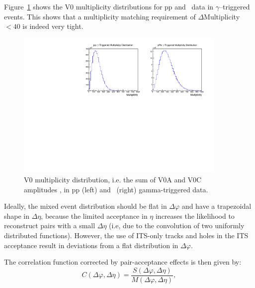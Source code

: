  Figure~\ref{fig:Multiplicitydistributions} shows the V0 multiplicity distributions for pp and \pPb~data in $\gamma$--triggered events. This shows that a multiplicity matching requirement of \(\Delta\)Multiplicity \(< 40\) is indeed very tight.

\begin{figure}[h]
\center
\includegraphics[width=0.9\textwidth]{Data_Analysis/EventMixing/Abs_Multplicity_Dist.pdf}
\caption{V0 multiplicity distribution, i.e. the sum of V0A and V0C amplitudes , in pp (left) and \pPb~(right) gamma-triggered data.}
\label{fig:Multiplicitydistributions}
\end{figure}

Ideally, the mixed event distribution should be flat in \(\Delta\varphi\) and have a trapezoidal shape in \(\Delta\eta\), because the limited acceptance in \(\eta\) increases the likelihood to reconstruct pairs with a small \(\Delta\eta\) (i.e, due to the convolution of two uniformly distributed functions). However, the use of ITS-only tracks and holes in the ITS acceptance result in deviations from a flat distribution in \(\Delta\varphi\). %

The correlation function corrected by pair-acceptance effects is then given by:
\begin{equation}
\label{eq:Y}
C(\Delta \varphi, \Delta \eta) = \frac{S(\Delta \varphi, \Delta \eta)}{M(\Delta \varphi, \Delta \eta)},
\end{equation}



